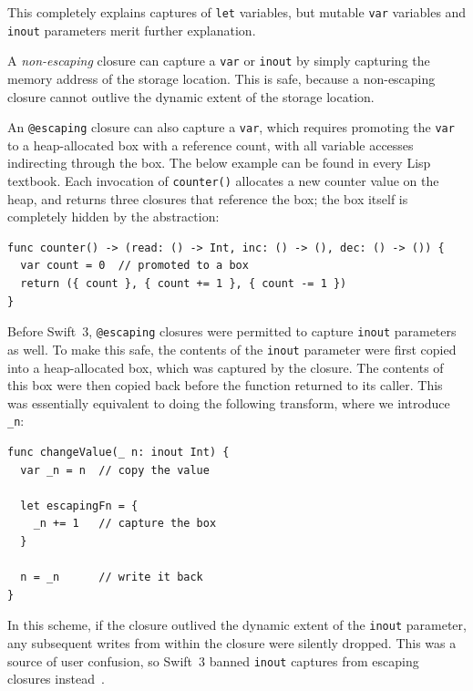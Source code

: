 \documentclass[../generics]{subfiles}
\begin{document}
This completely explains captures of \texttt{let} variables, but mutable \texttt{var} variables and \texttt{inout} parameters merit further explanation.

A \emph{non-escaping} closure can capture a \texttt{var} or \texttt{inout} by simply capturing the memory address of the storage location. This is safe, because a non-escaping closure cannot outlive the dynamic extent of the storage location.

An \texttt{@escaping} closure can also capture a \texttt{var}, which requires promoting the \texttt{var} to a heap-allocated box with a reference count, with all variable accesses indirecting through the box. The below example can be found in every Lisp textbook. Each invocation of \texttt{counter()} allocates a new counter value on the heap, and returns three closures that reference the box; the box itself is completely hidden by the abstraction:
\begin{Verbatim}
func counter() -> (read: () -> Int, inc: () -> (), dec: () -> ()) {
  var count = 0  // promoted to a box
  return ({ count }, { count += 1 }, { count -= 1 })
}
\end{Verbatim}

Before Swift~3, \texttt{@escaping} closures were permitted to capture \texttt{inout} parameters as well. To make this safe, the contents of the \texttt{inout} parameter were first copied into a heap-allocated box, which was captured by the closure. The contents of this box were then copied back before the function returned to its caller. This was essentially equivalent to doing the following transform, where we introduce \verb|_n|:
\begin{Verbatim}
func changeValue(_ n: inout Int) {
  var _n = n  // copy the value

  let escapingFn = {
    _n += 1   // capture the box
  }

  n = _n      // write it back
}
\end{Verbatim}
In this scheme, if the closure outlived the dynamic extent of the \texttt{inout} parameter, any subsequent writes from within the closure were silently dropped. This was a source of user confusion, so Swift~3 banned \texttt{inout} captures from escaping closures instead~\cite{se0035}.
\end{document}
